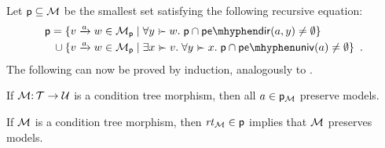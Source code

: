 %
Let ${\mathsf{p}}\subseteq {\mathcal{M}}$ be the smallest set satisfying the following recursive equation:
%
\begin{align*}
 \pgen = {} & \gensetof{\trip vaw\in \cM_\pgen}{\forall y\childof w\st \pgen\cap \pedir{a,y}\neq\emptyset} \\
   {}\cup{} & \gensetof{\trip vaw\in \cM_\pgen}{\exists x\childof v\st \forall y\childof x\st \pgen\cap \peuniv{a}\neq\emptyset} \enspace.
\end{align*}
%
The following can now be proved by induction, analogously to .
%
\begin{lemma}\label{lem:preservation}
If ${\mathcal{M}}{:}\,{\mathcal{T}}\rightarrow {\mathcal{U}}$ is a condition tree morphism, then all $a\in {\mathsf{p}}_{\mathcal{M}}$ preserve models.
\end{lemma}
%
\begin{corollary}
If ${\mathcal{M}}$ is a condition tree morphism, then $\mathit{rt}_{{\mathcal{M}}}\in{\mathsf{p}}$ implies that ${\mathcal{M}}$ preserves models.
\end{corollary}